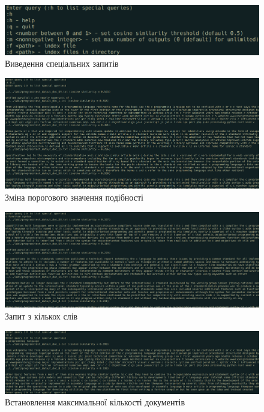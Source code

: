 \documentclass{../../templates/information_retrieval_lab}
\begin{document}
\begin{figure}[H]
    \centering
    \includegraphics[width=\textwidth]{img/screen2.png}
    \caption{Виведення спеціальних запитів}
\end{figure}

\begin{figure}[H]
    \centering
    \includegraphics[width=\textwidth]{img/screen3.png}
    \caption{Зміна порогового значення подібності}
\end{figure}

\begin{figure}[H]
    \centering
    \includegraphics[width=\textwidth]{img/screen4.png}
    \caption{Запит з кількох слів}
\end{figure}

\begin{figure}[H]
    \centering
    \includegraphics[width=\textwidth]{img/screen5.png}
    \caption{Встановлення максимальної кількості документів}
\end{figure}
\end{document}
